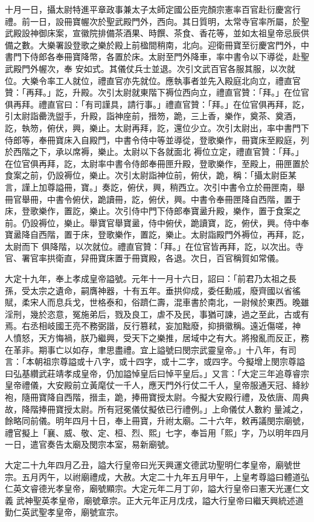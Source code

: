 \begin{pinyinscope}
 十月一日，攝太尉特進平章政事兼太子太師定國公臣完顏宗憲率百官赴衍慶宮行禮。前一日，設冊寶幄次於聖武殿門外，西向。其日質明，太常寺官率所屬，於聖武殿設神御床案，宣徽院排備茶酒果、時饌、茶食、香花等，並如太祖皇帝忌辰供備之數。大樂署設登歌之樂於殿上前楹間稍南，北向。迎衛冊寶至衍慶宮門外，中書門下侍郎各奉冊寶降幣，各置於床。太尉至門外降車，率中書令以下導從，赴聖武殿門外幄次，奉
 安如式。其儀仗兵士並退。次引文武百官各服其服，以次就位。大樂令率工人就位，禮直官亦先就位。應執事者並先入殿庭北向立，禮直官贊：「再拜。」訖，升殿。次引太尉就東階下褥位西向立，禮直官贊：「拜。」在位官俱再拜。禮直官曰：「有司謹具，請行事。」禮直官贊：「拜。」在位官俱再拜，訖，引太尉詣罍洗盥手，升殿，詣神座前，搢笏，跪，三上香，樂作，奠茶、奠酒，訖，執笏，俯伏，興，樂止。太尉再拜，訖，還位少立。次引太尉出，率中書門下侍郎等，奉冊寶床入自殿門，中書令侍中等並導從，登歌樂作，冊寶床至殿庭，列於西階之下，承以席褥，樂止。太尉以下各就面北
 褥位立定，禮直官贊：「拜。」在位官俱再拜，訖，太尉率中書令侍郎奉冊匣升殿，登歌樂作，至殿上，冊匣置於食案之前，仍設褥位，樂止。次引太尉詣神位前，俯伏，跪，稱：「攝太尉臣某言，謹上加尊謚冊，寶。」奏訖，俯伏，興，稍西立。次引中書令立於冊匣南，舉冊官舉冊，中書令俯伏，跪讀冊，訖，俯伏，興。中書令奉冊匣降自西階，置于床，登歌樂作，置訖，樂止。次引侍中門下侍郎奉寶盝升殿，樂作，置于食案之前。仍設褥位，樂止。舉寶官舉寶盝，侍中俯伏，跪讀寶，訖，俯伏，興。侍中奉寶盝降自西階，置于床，登歌樂作，置訖，樂止。太尉詣殿門外褥位，再拜，訖，太尉而下
 俱降階，以次就位。禮直官贊：「拜。」在位官皆再拜，訖，以次出。寺官、署官率拱衛直，舁冊寶床置于冊寶殿，各退。次日，百官稱賀如常儀。



 大定十九年，奉上孝成皇帝謚號。元年十一月十六日，詔曰：「前君乃太祖之長孫，受太宗之遺命，嗣膺神器，十有五年。垂拱仰成，委任勳戚，廢齊國以省徭賦，柔宋人而息兵戈，世格泰和，俗躋仁壽，混車書於南北，一尉候於東西。晚雖淫刑，幾於恣意，冤施弟后，戮及良工，虐不及民，事猶可諫，過之至此，古或有焉。右丞相岐國王亮不務弼諧，反行篡弒，妄加黜廢，抑損徽稱。遠近傷嗟，神
 人憤怒，天方悔禍，朕乃繼興，受天下之樂推，居域中之有大。將撥亂而反正，務在革非。期事亡以如存，聿思盡禮。宜上謚號曰閔宗武靈皇帝。」十八年，有司言：「本朝祖宗尊謚或十八字，或十四字，或十二字，或四字。今擬增上閔宗尊謚曰弘基纘武莊靖孝成皇帝，仍加謚悼皇后曰悼平皇后。」又言：「大定三年追尊睿宗皇帝禮儀，大安殿前立黃麾仗一千人，應天門外行仗二千人，皇帝服通天冠、絳紗袍，隨冊寶降自西階，搢圭，跪，捧冊寶授太尉。今擬大安殿行禮，及依唐、周典故，降階捧冊寶授太尉。所有冠冕儀仗擬依已行禮例。」上命儀仗人數約
 量減之，餘略同前儀。明年四月十日，奉上冊寶，升祔太廟。二十六年，敕再議閔宗廟號，禮官擬上「襄、威、敬、定、桓、烈、熙」七字，奉旨用「熙」字，乃以明年四月一日，遣官奏告太廟及閔宗本室，易新廟號。



 大定二十九年四月乙丑，謚大行皇帝曰光天興運文德武功聖明仁孝皇帝，廟號世宗。五月丙午，以祔廟禮成，大赦。大定二十九年五月甲午，上皇考尊謚曰體道弘仁英文睿德光孝皇帝，廟號顯宗。大定元年二月丁卯，謚大行皇帝曰憲天光運仁文義
 武神聖英孝皇帝，廟號章宗。正大元年正月戊戌，謚大行皇帝曰繼天興統述道勤仁英武聖孝皇帝，廟號宣宗。



\end{pinyinscope}